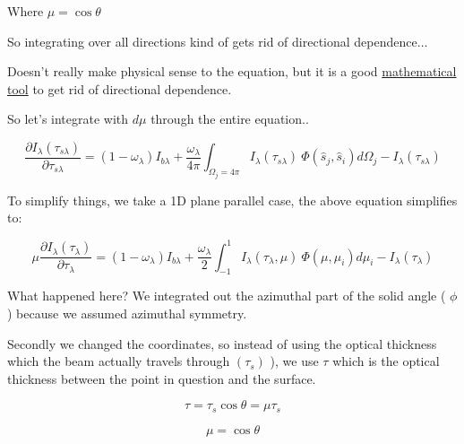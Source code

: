 \documentclass[12pt]{article}
\renewcommand{\_}{\kern-1.5pt\textunderscore\kern-1.5pt}
\begin{document}
\begin{itemize}
Where  \(  \mu =\cos  \theta  \) \par

So integrating over all directions kind of gets rid of directional dependence$ \ldots $ \par

Doesn’t really make physical sense to the equation, but it is a good \uline{mathematical tool} to get rid of directional dependence.\par

So let’s integrate with  \( d \mu  \)  through the entire equation..\par

 \[ \frac{ \partial I_{ \lambda } \left(  \tau_{s \lambda } \right) }{ \partial  \tau_{s \lambda }}= \left( 1- \omega _{ \lambda } \right)  I_{b \lambda }+\frac{ \omega _{ \lambda }}{4 \pi } \int _{ \Omega _{j}=4 \pi }^{}I_{ \lambda } \left(  \tau_{s \lambda } \right) ~ \Phi  \left( \hat{s}_{j},\hat{s}_{i} \right) d \Omega _{j}-I_{ \lambda } \left(  \tau_{s \lambda } \right)  \] \par

To simplify things, we take a 1D plane parallel case, the above equation simplifies to:\par

 \[  \mu  \frac{ \partial I_{ \lambda } \left(  \tau_{ \lambda } \right) }{ \partial  \tau_{ \lambda }}= \left( 1- \omega _{ \lambda } \right) I_{b \lambda }+\frac{ \omega _{ \lambda }}{2} \int _{-1}^{1}I_{ \lambda } \left(  \tau_{ \lambda }, \mu  \right) ~ \Phi  \left(  \mu , \mu _{i} \right) d \mu _{i}-I_{ \lambda } \left(  \tau_{ \lambda } \right)  \] \par

What happened here? We integrated out the azimuthal part of the solid angle ( \(  \phi  \) ) because we assumed azimuthal symmetry.\par

\par

Secondly we changed the coordinates, so instead of using the optical thickness which the beam actually travels through  \(  \left(  \tau_{s} \right) \) ), we use  \(  \tau \)  which is the optical thickness between the point in question and the surface.\par

 \[  \tau= \tau_{s}\cos  \theta = \mu   \tau_{s} \] \par

 \[  \mu =\cos  \theta  \] \par


\end{itemize}
\end{document}
